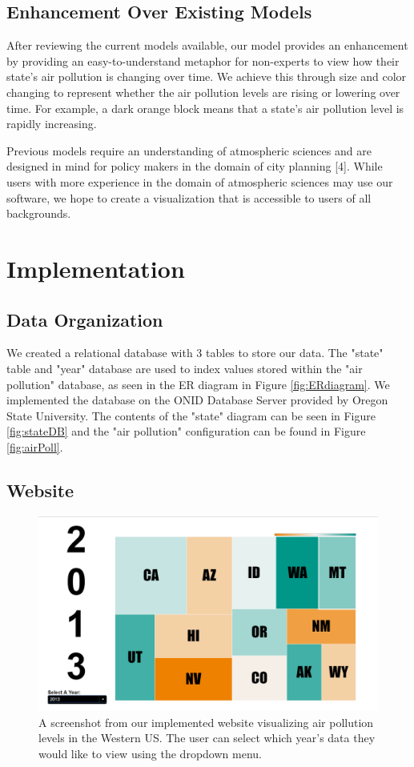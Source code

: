 \documentclass[journal]{vgtc}                %
\begin{document}
\subsection{Enhancement Over Existing Models}

After reviewing the current models available, our model provides an enhancement by providing an easy-to-understand
metaphor for non-experts to view how their state's air pollution is changing over time. We achieve this through size
and color changing to represent whether the air pollution levels are rising or lowering over time. For example, a dark
orange block means that a state's air pollution level is rapidly increasing.

Previous models require an understanding of atmospheric sciences and are designed in mind for policy makers in the domain
of city planning [4]. While users with more experience in the domain of atmospheric sciences may use our
software, we hope to create a visualization that is accessible to users of all backgrounds.

\section{Implementation}

\subsection{Data Organization}
We created a relational database with 3 tables to store our data. The "state" table and "year" database are used to
index values stored within the "air pollution" database, as seen in the ER diagram in Figure \ref{fig:ERdiagram}.
We implemented the database on the ONID Database Server provided by Oregon State University. The contents
of the "state" diagram can be seen in Figure \ref{fig:stateDB} and the "air pollution" configuration can be found in 
Figure \ref{fig:airPoll}.

\subsection{Website}

\begin{figure}
   \includegraphics[width=\columnwidth]{2013_viz.png}
   \caption{A screenshot from our implemented website visualizing air pollution levels in the Western US. The user can select which year's data they
   would like to view using the dropdown menu. \label{fig:screenshot_all}}
\end{figure}
\end{document}
